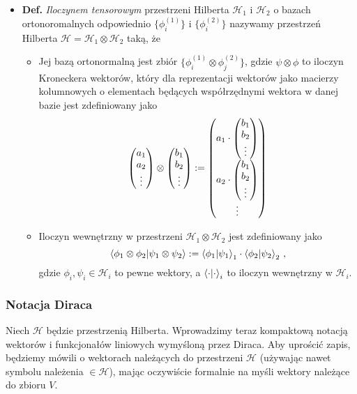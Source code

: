\documentclass{myclass}
\begin{document}
\begin{itemize}
    \item \textbf{Def.} \textit{Iloczynem tensorowym} przestrzeni Hilberta \(\mathscr{H}_1\) i
    \(\mathscr{H}_2\) o bazach ortonoromalnych odpowiednio \(\{\phi_i^{(1)}\}\) i
    \(\{\phi_i^{(2)}\}\) nazywamy przestrzeń Hilberta \(\mathscr{H} = \mathscr{H}_1 \otimes
    \mathscr{H}_2\) taką, że
    \begin{itemize}
        
        \item Jej bazą ortonormalną jest zbiór \(\{\phi_i^{(1)} \otimes \phi_j^{(2)}\}\), gdzie
        \(\psi \otimes \phi\) to iloczyn Kroneckera wektorów, który dla reprezentacji wektorów jako
        macierzy kolumnowych o elementach będących współrzędnymi wektora w danej bazie jest
        zdefiniowany jako
        \begin{equation*}
            \mqty(a_1 \\ a_2 \\ \vdots) \otimes \mqty(b_1 \\ b_2 \\ \vdots) := \mqty(a_1 \cdot \mqty(b_1 \\ b_2 \\ \vdots) \\ a_2 \cdot \mqty(b_1 \\ b_2 \\ \vdots) \\ \vdots )
        \end{equation*}

        \item Iloczyn wewnętrzny w przestrzeni \(\mathscr{H}_1 \otimes \mathscr{H}_2\) jest
        zdefiniowany jako
        \begin{equation*}
            \braket{\phi_1 \otimes \phi_2}{\psi_1 \otimes \psi_2} := \braket{\phi_1}{\psi_1}_1 \cdot \braket{\phi_2}{\psi_2}_2\,,
        \end{equation*}
        gdzie \(\phi_i,\psi_i \in \mathscr{H}_i\) to pewne wektory, a \(\braket{\cdot}_i\) to
        iloczyn wewnętrzny w \(\mathscr{H}_i\).
    \end{itemize}

\end{itemize}

\subsubsection{Notacja Diraca}

Niech \(\mathscr{H}\) będzie przestrzenią Hilberta. Wprowadzimy teraz kompaktową notacją wektorów i
funkcjonałów liniowych wymyśloną przez Diraca. Aby uprościć zapis, będziemy mówili o wektorach
należących do przestrzeni \(\mathscr{H}\) (używając nawet symbolu należenia \(\in \mathscr{H}\)),
mając oczywiście formalnie na myśli wektory należące do zbioru \(V\).
\end{document}
